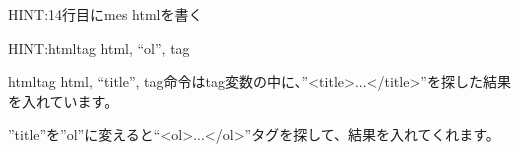 
\begin{tcolorbox}[title=\useOmetoi,breakable]\label{Q:mes}
  \begin{enumerate}
    HINT:14行目にmes htmlを書く
  \end{enumerate}
\end{tcolorbox}


\begin{tcolorbox}[title=\useOmetoi,breakable]\label{Q:ol}
  \begin{enumerate}
    HINT:htmltag html, “ol”, tag

    htmltag html, “title”, tag命令はtag変数の中に、”{\textless}title{\textgreater}...{\textless}/title{\textgreater}”を探した結果を入れています。
    
    ”title”を”ol”に変えると“{\textless}ol{\textgreater}...{\textless}/ol{\textgreater}”タグを探して、結果を入れてくれます。
  \end{enumerate}
\end{tcolorbox}



